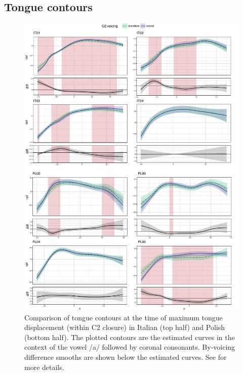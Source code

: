 \documentclass[authoryear, 5p]{elsarticle}
\begin{document}

\subsection{Tongue contours}\label{tongue-contours}

\label{s:splines}

\begin{figure}
    \centering
    \includegraphics[height=.9\textheight]{fig/tra-colour.pdf}
    \caption{Comparison of tongue contours at the time of maximum tongue displacement (within C2 closure) in Italian (top half) and Polish (bottom half). The plotted contours are the estimated curves in the context of the vowel /a/ followed by coronal consonants. By-voicing difference smooths are shown below the estimated curves. See  for more details.}
    \label{f:tra}
\end{figure}
\end{document}
